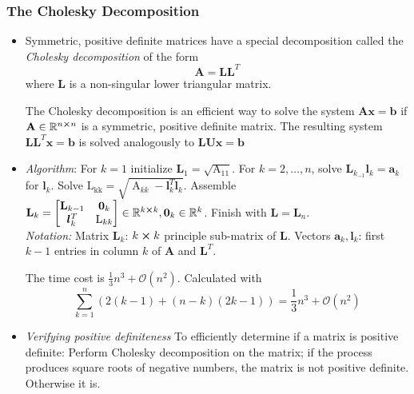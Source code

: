 \documentclass[11pt, a4paper]{article}
\newcommand{\R}{\mathbb{R}} %
\newcommand{\mat}[1]{\mathbf{#1}} %
\begin{document}
\subsubsection{The Cholesky Decomposition}
\begin{itemize}
	\item Symmetric, positive definite matrices have a special decomposition called the \textit{Cholesky decomposition} of the form	
	\begin{equation*}
		\mat{A} = \mathbf{L} \mathbf{L}^{T}
	\end{equation*}
	where $ \mathbf{L} $ is a non-singular lower triangular matrix. 
	
	The Cholesky decomposition is an efficient way to solve the system $ \mat{A} \bm{x} = \bm{b} $ if $ \mat{A} \in \R^{n\cross n} $ is a symmetric, positive definite matrix. The resulting system $ \mat{L}\mat{L}^{T}\bm{x} = \bm{b} $ is solved analogously to $ \mat{L}\mat{U}\bm{x} = \bm{b} $
	
	\item \textit{Algorithm}: For $ k = 1 $ initialize $ \mat{L}_{1} = \sqrt{\operatorname{A_{11}}} $. For $ k = 2, \ldots, n $, solve $ \mat{L}_{k_{-1}}\bm{l}_{k} = \bm{a}_{k} $ for $ \bm{l}_{k} $. Solve $ \operatorname{L_{kk}} = \sqrt{\operatorname{A}_{kk} - \bm{l}_{k}^{T}\bm{l}_{k}} $. Assemble $ \mat{L}_{k} = \left[\begin{matrix}\mat{L}_{k-1} & \bm{0}_{k}\\ \bm{l}_{k}^{T} & \operatorname{L}_{kk}\end{matrix}\right] \in \R^{k\cross k}, \bm{0}_{k} \in \R^{k} $. Finish with $ \mat{L} = \mat{L}_{n} $.\\
	\textit{Notation:} Matrix $ \mat{L}_{k} $: $ k \cross k $ principle sub-matrix of $ \mat{L} $. Vectors $ \bm{a}_{k}, \bm{l}_{k} $: first $ k-1 $ entries in column $ k $ of $ \mat{A} $ and $ \mat{L}^{T} $.
	
	The time cost is $ \frac{1}{3}n^{3} + \mathcal{O}(n^2) $. Calculated with
	\begin{equation*}
		\sum_{k=1}^{n}(2(k-1) + (n-k)(2k-1)) = \frac{1}{3}n^{3} + \mathcal{O}(n^{2})
	\end{equation*}


	\item \textit{Verifying positive definiteness} To efficiently determine if a matrix is positive definite: Perform Cholesky decomposition on the matrix; if the process produces square roots of negative numbers, the matrix is not positive definite. Otherwise it is.
\end{itemize}
\end{document}
